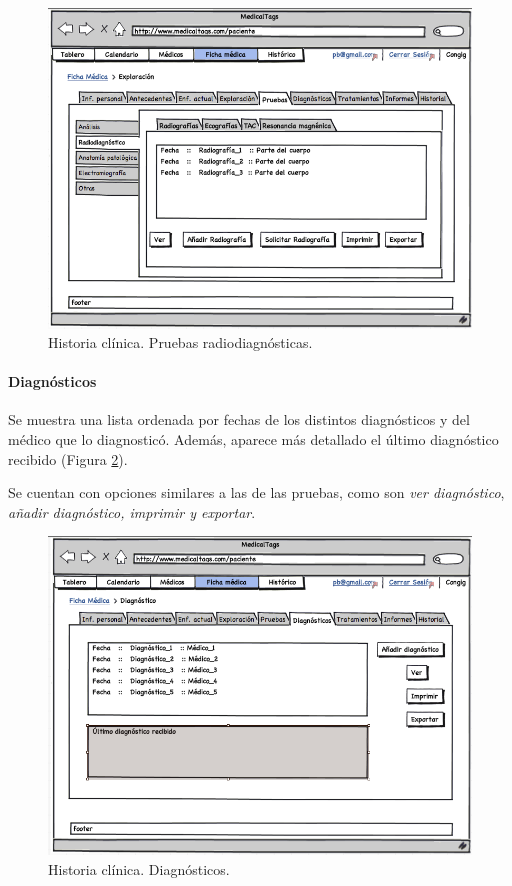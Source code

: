 			\begin{figure}[H]
			  \centering
			    \includegraphics[width=12cm]{img/png/interfaz/35_Pruebas_Pacientes2.png}
			  \caption{Historia clínica. Pruebas radiodiagnósticas.}
			  \label{fig:iu_prueba_radio}
			\end{figure}
				
		
		\paragraph{Diagnósticos} %
		\label{par:inter_diagnosticos}
		
			Se muestra una lista ordenada por fechas de los distintos diagnósticos y del médico que lo diagnosticó. Además, aparece más detallado el último diagnóstico recibido (Figura \ref{fig:iu_diagnostico}). 
			
			Se cuentan con opciones similares a las de las pruebas, como son \textit{ver diagnóstico}, \textit{añadir diagnóstico, imprimir y exportar}.
			
			
			\begin{figure}[H]
			  \centering
			    \includegraphics[width=12cm]{img/png/interfaz/36_Diagnosticos_Pacientes.png}
			  \caption{Historia clínica. Diagnósticos.}
			  \label{fig:iu_diagnostico}
			\end{figure}
		
